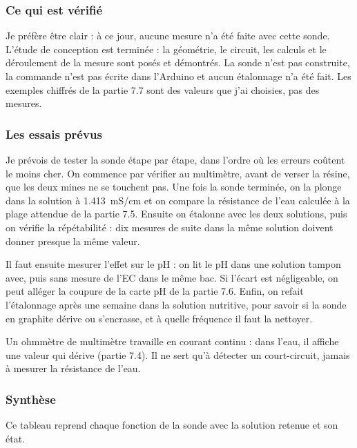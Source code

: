 \subsubsection*{Ce qui est vérifié}

Je préfère être clair : à ce jour, aucune mesure n'a été faite avec cette sonde. L'étude de conception est terminée : la géométrie, le circuit, les calculs et le déroulement de la mesure sont posés et démontrés. La sonde n'est pas construite, la commande n'est pas écrite dans l'Arduino et aucun étalonnage n'a été fait. Les exemples chiffrés de la partie 7.7 sont des valeurs que j'ai choisies, pas des mesures.

\subsubsection*{Les essais prévus}

Je prévois de tester la sonde étape par étape, dans l'ordre où les erreurs coûtent le moins cher. On commence par vérifier au multimètre, avant de verser la résine, que les deux mines ne se touchent pas. Une fois la sonde terminée, on la plonge dans la solution à \qty{1,413}{mS/cm} et on compare la résistance de l'eau calculée à la plage attendue de la partie 7.5. Ensuite on étalonne avec les deux solutions, puis on vérifie la répétabilité : dix mesures de suite dans la même solution doivent donner presque la même valeur.

Il faut ensuite mesurer l'effet sur le pH : on lit le pH dans une solution tampon avec, puis sans mesure de l'EC dans le même bac. Si l'écart est négligeable, on peut alléger la coupure de la carte pH de la partie 7.6. Enfin, on refait l'étalonnage après une semaine dans la solution nutritive, pour savoir si la sonde en graphite dérive ou s'encrasse, et à quelle fréquence il faut la nettoyer.

\begin{attention}
Un ohmmètre de multimètre travaille en courant continu : dans l'eau, il affiche une valeur qui dérive (partie 7.4). Il ne sert qu'à détecter un court-circuit, jamais à mesurer la résistance de l'eau.
\end{attention}

\subsubsection*{Synthèse}

Ce tableau reprend chaque fonction de la sonde avec la solution retenue et son état.

